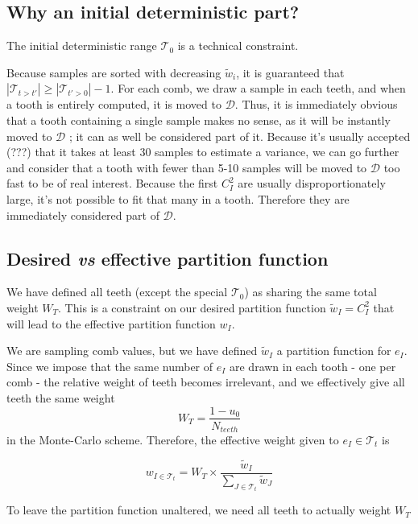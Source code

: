 \documentclass[./thesis.tex]{subfiles}
\begin{document}
\subsection*{Why an initial deterministic part?}

The initial deterministic range $\mathcal{T}_0$ is a technical constraint.

Because samples are sorted with decreasing $\tilde w_i$, it is guaranteed that $|\mathcal{T}_{t>t'}| \geq |\mathcal{T}_{t'>0}|-1$.
For each comb, we draw a sample in each teeth, and when a tooth is entirely computed, it is moved to $\mathcal{D}$. Thus, it is immediately obvious that a tooth containing a single sample makes no sense, as it will be instantly moved to $\mathcal{D}$ ; it can as well be considered part of it. Because it's usually accepted (???) that it takes at least 30 samples to estimate a variance, we can go further and consider that a tooth with fewer than 5-10 samples will be moved to $\mathcal{D}$ too fast to be of real interest. Because the first $C_I^2$ are usually disproportionately large, it's not possible to fit that many in a tooth. Therefore they are immediately considered part of $\mathcal{D}$.

\subsection*{Desired \textit{vs} effective partition function}

We have defined all teeth (except the special $\mathcal{T}_0$) as sharing the same total weight $W_T$. This is a constraint on our desired partition function $\tilde w_I = C_I^2$ that will lead to the effective partition function $w_I$.

We are sampling comb values, but we have defined $\tilde w_I$ a partition function for $e_I$. Since we impose that the same number of $e_I$ are drawn in each tooth - one per comb - the relative weight of teeth becomes irrelevant, and we effectively give all teeth the same weight 
\begin{equation}
W_T=\frac{1-u_0}{N_{teeth}}
\end{equation}
in the Monte-Carlo scheme. Therefore, the effective weight given to $e_I \in \mathcal{T}_t$ is

\begin{equation}
w_{I \in \mathcal{T}_t} = W_T \times \frac{\tilde w_I}{\sum_{J \in \mathcal{T}_t} \tilde w_J}
\end{equation}

To leave the partition function unaltered, we need all teeth to actually weight $W_T$
\end{document}
